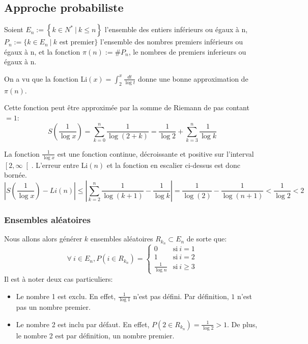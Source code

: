 \documentclass[../main.tex]{report}
\begin{document}
    \label{sec:test1}
    
\subsection{Approche probabiliste}
Soient $E_n := \left\{ k \in N^* ~|~k \leq n \right\}$ l'ensemble des entiers inférieurs ou égaux à n, $ P_n := \{k \in E_n~|~ k$ est premier$ \}$ l'ensemble des nombres premiers inférieurs ou égaux à n, et la fonction $\pi (n) := \#P_n$, le nombres de premiers inferieurs ou égaux à n.

On a vu que la fonction Li$(x) = \int_2^x \frac{dt}{\log t}$ 
donne une bonne approximation de $\pi(n)$.

Cette fonction peut être approximée par la somme de Riemann de pas contant $=1$:
\begin{equation}
\label{eq:SommeDeRiemann}
S(\frac{1}{\log x})
= \sum_{k=0}^n \frac{1}{\log(2 + k)}
= \frac{1}{\log 2} + \sum_{k=3}^n \frac{1}{\log k}
\end{equation}


La fonction $\frac{1}{\log x}$ est une fonction continue, décroissante et positive sur l'interval $\left[2, \infty \right[$. 
L'erreur entre Li$(n)$ et la fonction en escalier ci-dessus est donc bornée. 
 \[ 
\left| S(\frac{1}{\log x}) - Li(n) \right|
\leq \left| \sum_{k=2}^n \frac{1}{\log (k+1)} - \frac{1}{\log k} \right| 
 = \frac{1}{\log (2)} - \frac{1}{\log (n+1)}
 < \frac{1}{\log 2}
 < 2
 \]


\subsubsection{Ensembles aléatoires} 

Nous allons alors générer $k$ ensembles aléatoires $R_{k_n} \subset E_n$ de sorte que:
\[
\forall~i \in E_n, P(i \in R_{k_n}) = 
\left\{ 
    \begin{array}{cl}
         0 & \mbox{si}~i = 1 \\
         1 & \mbox{si}~i = 2 \\
         \frac{1}{\log n} & \mbox{si}~i \geq 3
    \end{array}
\right.
\]
Il est à noter deux cas particuliers:
\begin{itemize} 
    \item Le nombre 1 est exclu. En effet, $\frac{1}{\log 1}$ n'est pas défini. Par définition, $1$ n'est pas un nombre premier.
    \item Le nombre 2 est inclu par défaut. En effet, $P(2 \in R_{k_n}) = \frac{1}{\log 2} > 1$. De plus, le nombre 2 est par définition, un nombre premier.
\end{itemize}
\end{document}
